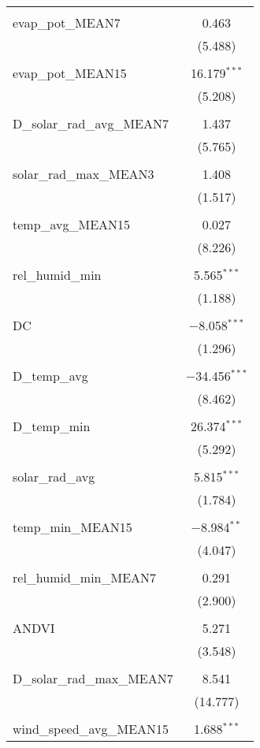 \begin{table}[!htbp]
\begin{tabular}{@{\extracolsep{5pt}}lc}
  & \\ 
 evap\_pot\_MEAN7 & 0.463 \\ 
  & (5.488) \\ 
  & \\ 
 evap\_pot\_MEAN15 & 16.179$^{***}$ \\ 
  & (5.208) \\ 
  & \\ 
 D\_solar\_rad\_avg\_MEAN7 & 1.437 \\ 
  & (5.765) \\ 
  & \\ 
 solar\_rad\_max\_MEAN3 & 1.408 \\ 
  & (1.517) \\ 
  & \\ 
 temp\_avg\_MEAN15 & 0.027 \\ 
  & (8.226) \\ 
  & \\ 
 rel\_humid\_min & 5.565$^{***}$ \\ 
  & (1.188) \\ 
  & \\ 
 DC & $-$8.058$^{***}$ \\ 
  & (1.296) \\ 
  & \\ 
 D\_temp\_avg & $-$34.456$^{***}$ \\ 
  & (8.462) \\ 
  & \\ 
 D\_temp\_min & 26.374$^{***}$ \\ 
  & (5.292) \\ 
  & \\ 
 solar\_rad\_avg & 5.815$^{***}$ \\ 
  & (1.784) \\ 
  & \\ 
 temp\_min\_MEAN15 & $-$8.984$^{**}$ \\ 
  & (4.047) \\ 
  & \\ 
 rel\_humid\_min\_MEAN7 & 0.291 \\ 
  & (2.900) \\ 
  & \\ 
 ANDVI & 5.271 \\ 
  & (3.548) \\ 
  & \\ 
 D\_solar\_rad\_max\_MEAN7 & 8.541 \\ 
  & (14.777) \\ 
  & \\ 
 wind\_speed\_avg\_MEAN15 & 1.688$^{***}$ \\ 

\end{tabular}
\end{table}
